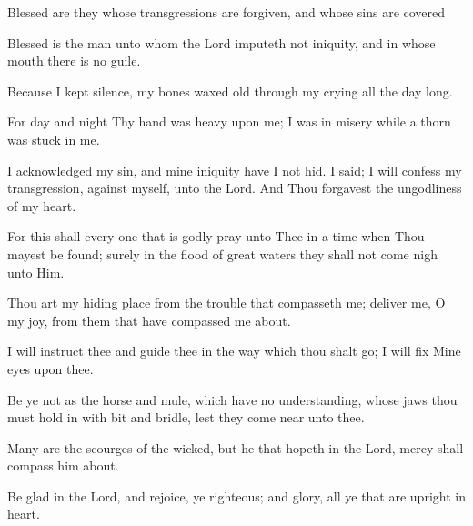 Blessed are they whose transgressions are forgiven, and whose sins are covered

Blessed is the man unto whom the Lord imputeth not iniquity, and in whose mouth there is no guile.

Because I kept silence, my bones waxed old through my crying all the day long.

For day and night Thy hand was heavy upon me; I was in misery while a thorn was stuck in me.

I acknowledged my sin, and mine iniquity have I not hid. I said; I will confess my transgression, against myself, unto the Lord. And Thou forgavest the ungodliness of my heart.

For this shall every one that is godly pray unto Thee in a time when Thou mayest be found; surely in the flood of great waters they shall not come nigh unto Him.

Thou art my hiding place from the trouble that compasseth me; deliver me, O my joy, from them that have compassed me about.

I will instruct thee and guide thee in the way which thou shalt go; I will fix Mine eyes upon thee.

Be ye not as the horse and mule, which have no understanding, whose jaws thou must hold in with bit and bridle, lest they come near unto thee.

Many are the scourges of the wicked, but he that hopeth in the Lord, mercy shall compass him about.

Be glad in the Lord, and rejoice, ye righteous; and glory, all ye that are upright in heart.
